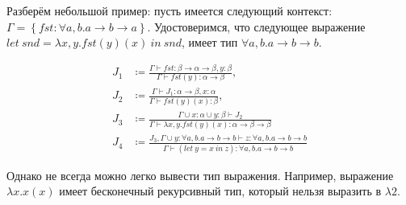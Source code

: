 Разберём небольшой пример: пусть имеется следующий контекст: $\Gamma = \left\{ fst: \forall a, b. a \to b \to a \right\}$.
Удостоверимся, что следующее выражение $let ~snd = \lambda x, y. fst(y)(x) ~in ~snd$, имеет тип $\forall a, b. a \to b \to b$.

\[
    \begin{aligned}
        J_1 &\coloneqq \frac{
            \Gamma \vdash fst: \beta \to \alpha \to \beta, y: \beta
        }{
            \Gamma \vdash fst(y): \alpha \to \beta
        }, \\
        J_2 &\coloneqq \frac{
            \Gamma \vdash J_1: \alpha \to \beta, x: \alpha
        }{
            \Gamma \vdash fst(y)(x): \beta
        }, \\
        J_3 &\coloneqq \frac{
            \Gamma \cup x: \alpha \cup y: \beta \vdash J_2
        }{
            \Gamma \vdash \lambda x, y. fst(y)(x): \alpha \to \beta \to \beta
        } \\
        J_4 &\coloneqq \frac{
            J_3, \Gamma \cup y: \forall a, b. a \to b \to b \vdash z: \forall a, b. a \to b \to b
        }{
            \Gamma \vdash (let ~y = x ~in~ z): \forall a, b. a \to b \to b
        }
    \end{aligned}
\]

Однако не всегда можно легко вывести тип выражения.
Например, выражение $\lambda x. x(x)$ имеет бесконечный рекурсивный тип, который нельзя выразить в $\lambda 2$.


